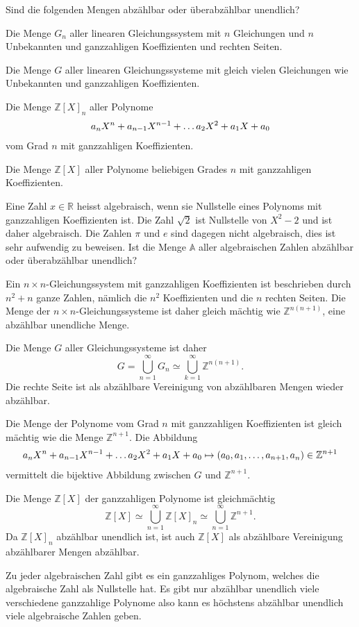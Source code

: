 Sind die folgenden Mengen abzählbar oder überabzählbar unendlich?
\begin{teilaufgaben}
\item
Die Menge $G_n$ aller linearen Gleichungssystem mit $n$ Gleichungen
und $n$ Unbekannten und ganzzahligen Koeffizienten und rechten Seiten.
\item
Die Menge $G$ aller linearen Gleichungssysteme mit gleich vielen Gleichungen
wie Unbekannten und ganzzahligen Koeffizienten.
\item
Die Menge $\mathbb Z[X]_n$ aller Polynome
\[
a_{\mathstrut n}X^n+a_{n-1}X^{n-1}+\dots a_2X^2+a_1X+a_0
\]
vom Grad $n$ mit ganzzahligen Koeffizienten.
\item
Die Menge $\mathbb Z[X]$ aller Polynome
beliebigen Grades $n$ mit ganzzahligen Koeffizienten.
\item
Eine Zahl $x\in \mathbb R$ heisst algebraisch, wenn sie Nullstelle
eines Polynoms mit ganzzahligen Koeffizienten ist.
Die Zahl $\sqrt{2}$ ist Nullstelle von $X^2-2$ und ist daher algebraisch.
Die Zahlen $\pi$ und $e$ sind dagegen nicht algebraisch, dies ist sehr
aufwendig zu beweisen.
Ist die Menge $\mathbb{A}$ aller algebraischen Zahlen abzählbar oder
überabzählbar unendlich?
\end{teilaufgaben}


\begin{loesung}
\begin{teilaufgaben}
\item
Ein $n\times n$-Gleichungssystem mit ganzzahligen 
Koeffizienten ist beschrieben durch $n^2+n$ ganze Zahlen, nämlich
die $n^2$ Koeffizienten und die $n$ rechten Seiten.
Die Menge der $n\times n$-Gleichungssysteme ist daher gleich
mächtig wie $\mathbb Z^{n(n+1)}$, eine abzählbar unendliche Menge.
\item
Die Menge $G$ aller Gleichungssysteme ist daher 
\[
G = \bigcup_{n=1}^\infty G_n \simeq \bigcup_{k=1}^\infty \mathbb Z^{n(n+1)}.
\]
Die rechte Seite ist als abzählbare Vereinigung von abzählbaren Mengen
wieder abzählbar.
\item
Die Menge der Polynome vom Grad $n$ mit ganzzahligen Koeffizienten
ist gleich mächtig wie die Menge $\mathbb Z^{n+1}$.
Die Abbildung
\[
a_{\mathstrut n}X^n+a_{n-1}X^{n-1}+\dots a_2X^2+a_1X+a_0
\mapsto
(a_0,a_1,\dots,a_{n+1},a_{\mathstrut n}) \in \mathbb{Z}^{n+1}
\]
vermittelt die bijektive Abbildung zwischen $G$ und $\mathbb Z^{n+1}$.
\item
Die Menge $\mathbb Z[X]$ der ganzzahligen Polynome ist gleichmächtig
\[
\mathbb Z[X]
\simeq
\bigcup_{n=1}^\infty \mathbb Z[X]_n
\simeq
\bigcup_{n=1}^\infty \mathbb Z^{n+1}.
\]
Da $\mathbb Z[X]_n$ abzählbar unendlich ist, ist auch $\mathbb Z[X]$
als abzählbare Vereinigung abzählbarer Mengen abzählbar.
\item
Zu jeder algebraischen Zahl gibt es ein ganzzahliges Polynom, welches
die algebraische Zahl als Nullstelle hat.
Es gibt nur abzählbar unendlich viele verschiedene ganzzahlige Polynome
also kann es höchstens abzählbar unendlich viele algebraische Zahlen geben.
\qedhere
\end{teilaufgaben}
\end{loesung}


